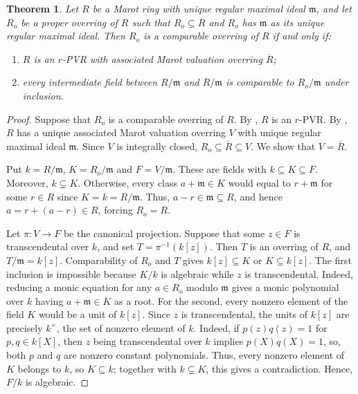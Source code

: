 \documentclass[12pt]{article}
\newtheorem{theorem}{Theorem}
\begin{document}
	\begin{theorem}\label{comparable-same-maximal}
		Let $R$ be a Marot ring with unique regular maximal ideal $\mathfrak{m}$, and let $R_o$ be a proper overring of $R$ such that $R_o\subseteq\overline R$ and $R_o$ has $\mathfrak{m}$ as its unique regular maximal ideal. Then $R_o$ is a comparable overring of $R$ if and only if:
		\begin{enumerate}[label=(\roman*)]
			\item $R$ is an $r$-PVR with associated Marot valuation overring $\overline R$;
			\item every intermediate field between $R/\mathfrak{m}$ and $\overline R/\mathfrak{m}$ is comparable to $R_o/\mathfrak{m}$ under inclusion.
		\end{enumerate}
	\end{theorem}
	\begin{proof}
		Suppose that $R_o$ is a comparable overring of $R$. By \cite[Corollary 3.5]{marot}, $R$ is an $r$-PVR. By \cite[Theorem 2.16]{marot}, $R$ has a unique associated Marot valuation overring $V$ with unique regular maximal ideal $\mathfrak{m}$. Since $V$ is integrally closed, $R_o\subseteq\overline R\subseteq V$. We show that $V=\overline R$.
		
		Put $k=R/\mathfrak{m}$, $K=R_o/\mathfrak{m}$ and $F=V/\mathfrak{m}$. These are fields with $k\subseteq K\subseteq F$. Moreover, $k\subsetneq K$. Otherwise, every class $a+\mathfrak{m}\in K$ would equal to $r+\mathfrak{m}$ for some $r\in R$ since $K=k=R/\mathfrak{m}$. Thus, $a-r\in\mathfrak{m}\subseteq R$, and hence $a=r+(a-r)\in R$, forcing $R_o=R$.
		
		Let $\pi:V\to F$ be the canonical projection. Suppose that some $z\in F$ is transcendental over $k$, and set $T=\pi^{-1}(k[z])$. Then $T$ is an overring of $R$, and $T/\mathfrak{m}=k[z]$. Comparability of $R_o$ and $T$ gives $k[z]\subseteq K$ or $ K\subseteq k[z].$ The first inclusion is impossible because $K/k$ is algebraic while $z$ is transcendental. Indeed, reducing a monic equation for any $a\in R_o$ modulo $\mathfrak m$ gives a monic polynomial over $k$ having $a+\mathfrak m\in K$ as a root. For the second, every nonzero element of the field $K$ would be a unit of $k[z]$. Since $z$ is transcendental, the units of $k[z]$ are precisely $k^\times$, the set of nonzero element of $k$. Indeed, if $p(z)q(z)=1$ for $p,q\in k[X]$, then $z$ being transcendental over $k$ implies $p(X)q(X)=1$, so, both $p$ and $q$ are nonzero constant polynomials. Thus, every nonzero element of $K$ belongs to $k$, so $K\subseteq k$; together with $k\subsetneq K$, this gives a contradiction. Hence, $F/k$ is algebraic.
		

\end{proof}
\end{document}
